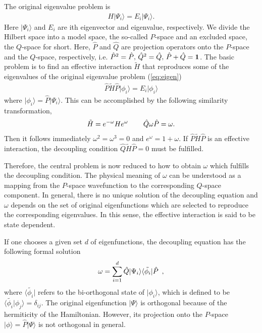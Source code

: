\documentclass[a4paper]{jpconf}
\def\bra#1{\langle #1 \rvert}
\def\ket#1{\lvert #1 \rangle}
\def\braket#1#2{\langle #1\lvert#2\rangle}
\begin{document}
  The original eigenvalue problem is
  \begin{align}
   \label{eq:eigen}
   H \ket{\Psi_i}= E_i \ket{\Psi_i}.
  \end{align}
  Here $\ket{\Psi_i}$ and $E_i$ are ith eigenvector and eigenvalue, respectively.
  We divide the Hilbert space into a model space, the so-called $P$-space and an excluded space, the  $Q$-space for short.
  Here, $\hat{P}$ and $\hat{Q}$ are projection operators onto the $P$-space and the $Q$-space,
  respectively, i.e. $\hat{P}^2=\hat{P},\,\hat{Q}^2=\hat{Q},\, \hat{P}+\hat{Q}={\bf 1}$.
  The basic problem is to find an effective interaction $\tilde{H}$ that
  reproduces some of the 
  eigenvalues of the original eigenvalue problem (\ref{eq:eigen})
  \begin{align}
   \label{eq:eigenP}
   \hat{P}\tilde{H}\hat{P} \ket{\phi_i} = E_i \ket{\phi_i}
  \end{align}
   where $\ket{\phi_i}=\hat{P} \ket{\Psi_i}$.
  This can be accomplished by the following similarity transformation,
  \begin{align}
   {\label{eq:transformation}}
   \tilde{H} = e^{- \omega} H  e^{\omega} \,\,\,\,\,\,\,\,\,\,\,\,\,
   \hat{Q}\omega \hat{P} = \omega.
  \end{align}
  Then it follows immediately $\omega^2=\omega^3=0$ and $e^{\omega} = 1+\omega$.
  If $\hat{P}\tilde{H}\hat{P}$ is an effective interaction, the decoupling condition
  $\hat{Q}\tilde{H}\hat{P}=0$ must be fulfilled.
  
  Therefore, the central problem is now reduced to 
  how to obtain $\omega$ which
  fulfills the decoupling condition.
  The physical meaning of $\omega$ can be understood as a mapping from the $P$-space
  wavefunction to the corresponding $Q$-space component.
  In general, there is no unique solution of the decoupling equation and
  $\omega$ depends on the set of original eigenfunctions which are
  selected to reproduce the corresponding eigenvalues. In this sense, the effective
  interaction is said to be state dependent.

  If one chooses a given set $d$ of eigenfunctions,
  the decoupling equation has 
 the  following formal solution
  \begin{align}
   {\label{eq:formal}}
   \omega =\sum_{i=1}^d \hat{Q} \ket{\Psi _i}\bra{\tilde{\phi_i}} \hat{P}\,\,\, ,
  \end{align}
  where $\bra{\tilde{\phi_i}}$ refers to the bi-orthogonal state of
  $\ket{\phi_i}$, which is defined to be
  $\braket{\tilde{\phi_i}}{\phi_j}=\delta_{ij}$. The original eigenfunction
  $\ket{\Psi}$ is orthogonal
  because of the hermiticity of the Hamiltonian. However, its projection onto
  the $P$-space $\ket{\phi}=\hat{P}\ket{\Psi}$ is not orthogonal in general.
  
\end{document}
